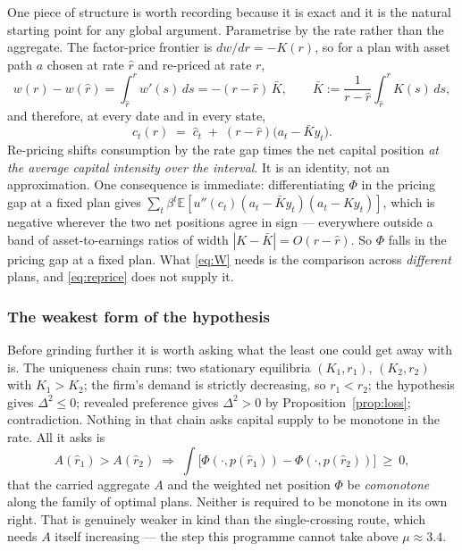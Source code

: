 One piece of structure is worth recording because it is exact and it is the natural starting point
for any global argument. Parametrise by the rate rather than the aggregate. The factor-price
frontier is $dw/dr=-K(r)$, so for a plan with asset path $a$ chosen at rate $\hat r$ and re-priced
at rate $r$,
\[
  w(r)-w(\hat r)=\int_{\hat r}^{r}w'(s)\,ds=-(r-\hat r)\,\bar K,
  \qquad \bar K:=\frac{1}{r-\hat r}\int_{\hat r}^{r}K(s)\,ds,
\]
and therefore, at every date and in every state,
\begin{equation}\label{eq:reprice}
  c_t(r)\;=\;\hat c_t\;+\;(r-\hat r)\bigl(a_t-\bar K y_t\bigr).
  \tag{R}
\end{equation}
Re-pricing shifts consumption by the rate gap times the net capital position \emph{at the average
capital intensity over the interval}. It is an identity, not an approximation. One consequence is
immediate: differentiating $\Phi$ in the pricing gap at a fixed plan gives
$\sum_t\beta^t\mathbb E[u''(c_t)(a_t-\bar Ky_t)(a_t-Ky_t)]$, which is negative wherever the two net
positions agree in sign --- everywhere outside a band of asset-to-earnings ratios of width
$|K-\bar K|=O(r-\hat r)$. So $\Phi$ falls in the pricing gap at a fixed plan. What \eqref{eq:W}
needs is the comparison across \emph{different} plans, and \eqref{eq:reprice} does not supply it.

\subsubsection*{The weakest form of the hypothesis}

Before grinding further it is worth asking what the least one could get away with is. The
uniqueness chain runs: two stationary equilibria $(K_1,r_1)$, $(K_2,r_2)$ with $K_1>K_2$; the firm's
demand is strictly decreasing, so $r_1<r_2$; the hypothesis gives $\Delta^2\le0$; revealed
preference gives $\Delta^2>0$ by Proposition~\ref{prop:loss}; contradiction. Nothing in that chain
asks capital supply to be monotone in the rate. All it asks is
\begin{equation}\label{eq:C}
  A(\hat r_1)>A(\hat r_2)\;\Longrightarrow\;
  \int\bigl[\Phi(\cdot,p(\hat r_1))-\Phi(\cdot,p(\hat r_2))\bigr]\ \ge\ 0,
  \tag{C}
\end{equation}
that the carried aggregate $A$ and the weighted net position $\Phi$ be \emph{comonotone} along the
family of optimal plans. Neither is required to be monotone in its own right. That is genuinely
weaker in kind than the single-crossing route, which needs $A$ itself increasing --- the step this
programme cannot take above $\mu\approx3.4$.

